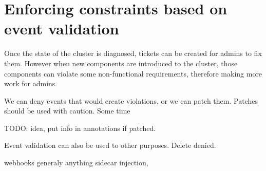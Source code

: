\section[Event validation based]{Enforcing constraints based on event validation}

Once the state of the cluster is diagnosed, tickets can be created for admins to fix them. However when new components are introduced to the cluster, those components can violate some non-functional requirements, therefore making more work for admins.


We can deny events that would create violations, or we can patch them. Patches should be used with caution. Some time 



TODO: idea, put info in annotations if patched.




Event validation can also be used to other purposes. Delete denied.

webhooks generaly anything sidecar injection, 



